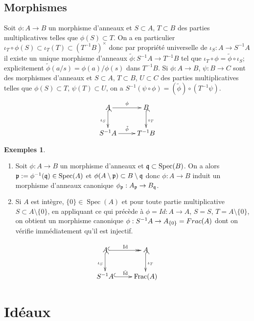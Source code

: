 \documentclass[a4paper, oneside, 12pt]{book}
\theoremstyle{theoremeStyle} %
\theoremstyle{definition} %
\newtheorem{exemples}[theoreme]{Exemples}
\DeclareMathOperator{\Spec}{Spec}
\DeclareMathOperator{\Frac}{Frac}
\begin{document}
\subsection{Morphismes}
Soit $\phi:A\rightarrow B$ un morphisme d'anneaux et $S\subset A$, $T\subset B$ des parties multiplicatives telles que $\phi(S)\subset T$. On a en particulier $\iota_T\circ \phi(S)\subset \iota_T(T)\subset (T^{-1}B)^\times$ donc par propriété universelle de $\iota_S:A\rightarrow S^{-1}A$ il existe un unique morphisme d'anneaux $\tilde{\phi}:S^{-1}A\rightarrow T^{-1}B$ tel que $\iota_T\circ \phi=\tilde{\phi}\circ \iota_S$; explicitement $\tilde{\phi}(a/s)=\phi(a)/\phi(s)$ dans $T^{-1}B$. Si $\phi:A\rightarrow B$, $\psi:B\rightarrow C$ sont des morphismes d'anneaux et $S\subset A$, $T\subset B$, $U\subset C$ des parties multiplicatives telles que $\phi(S)\subset T$, $\psi(T)\subset U$, on a $S^{-1}(\psi\circ \phi)=(\tilde{\phi})\circ (T^{-1}\psi)$. \\

	$$\xymatrix{
		A \ar[r]^\phi \ar@{^{(}->}[d]_{\iota_S} & B \ar@{^{(}->}[d]^{\iota_T} \\
		S^{-1}A \ar[r]^{\tilde{\phi}} & T^{-1}B
	}$$

\begin{exemples}
\begin{enumerate}
\item \label{LocMorphismes}Soit $\phi:A\rightarrow B$ un morphisme d'anneaux et $\frak{q}\subset \Spec(B)$. On a alors $\frak{p}:=\phi^{-1}(\frak{q})\in \Spec(A)$ et $\phi(A\setminus \frak{p})\subset B\setminus \frak{q}$ donc $\phi:A\rightarrow B$ induit un morphisme d'anneaux canonique $\phi_\frak{p}:A_{\frak{p}}\rightarrow B_{\frak{q}}$.
 \item Si $A$ est intègre,  $\lbrace 0\rbrace\in \Spec(A)$ et pour toute partie multiplicative $S\subset A\setminus \lbrace 0\rbrace$, en appliquant ce qui précède à $\phi=Id:A\rightarrow A$, $S=S$, $T=A\setminus \lbrace 0\rbrace$, on obtient un morphisme canonique $\phi:S^{-1}A\rightarrow A_{\lbrace 0\rbrace}=\\Frac(A)$ dont on vérifie immédiatement qu'il est injectif.
\end{enumerate}

	$$ \xymatrix{
		A \ar@{^{(}->>}[r]^{\mathrm{Id} } \ar@{^{(}->}[d]_{\iota_S} & A \ar@{^{(}->}[d]^{\iota_T} \\
		S^{-1}A \ar@{^{(}->}[r]^{\tilde{\mathrm{Id} } } & \mathrm{\Frac}(A) }
	$$
\end{exemples}
\section{Idéaux}\label{LocIdeal}
\end{document}

